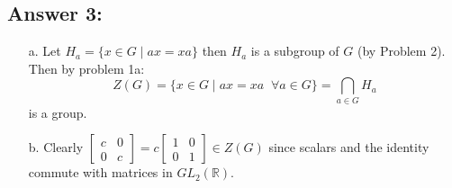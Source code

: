 \documentclass[%
  10pt,
  letterpaper
]{article}
\begin{document}
\subsection*{Answer 3:}
\begin{itemize}
\item[a.] Let $H_a = \{x \in G \mid ax=xa\}$ then  $H_a$ is a subgroup of $G$ (by Problem 2).
Then by problem 1a:
  \[ Z(G) = \{ x \in G \mid ax = xa \;\; \forall a \in G \} = \bigcap_{a\in G}H_a\]
  is a group.
\item[b.]  Clearly $\begin{bmatrix}
      c & 0 \\
      0 & c
    \end{bmatrix} = c \begin{bmatrix}
      1 & 0 \\
      0 & 1
    \end{bmatrix} \in Z(G)$ since scalars and the identity commute with matrices in $GL_2(\mathbb{R})$.


\end{itemize}
\end{document}

